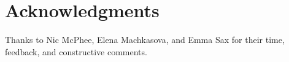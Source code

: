 \documentclass{sig-alternate}
\begin{document}

\section*{Acknowledgments}
\label{sec:acknowledgments}

Thanks to Nic McPhee, Elena Machkasova, and Emma Sax for their time, feedback, and constructive comments.


  
\end{document}
